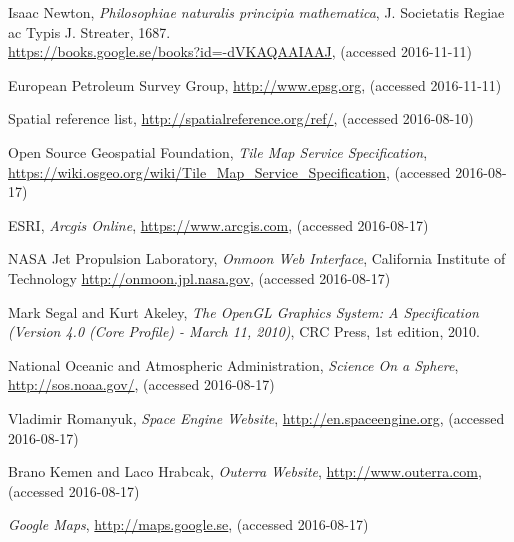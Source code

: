 \begin{thebibliography}{99}
  Isaac Newton,
  \emph{Philosophiae naturalis principia mathematica},
  J. Societatis Regiae ac Typis J. Streater,
  1687. \\
  \url{https://books.google.se/books?id=-dVKAQAAIAAJ},
  (accessed 2016-11-11)
  
  European Petroleum Survey Group,
  \url{http://www.epsg.org},
  (accessed 2016-11-11)
  
  Spatial reference list,
  \url{http://spatialreference.org/ref/},
  (accessed 2016-08-10)


  Open Source Geospatial Foundation,
  \emph{Tile Map Service Specification},
  \url{https://wiki.osgeo.org/wiki/Tile_Map_Service_Specification},
  (accessed 2016-08-17)
  
  ESRI,
  \emph{Arcgis Online},
  \url{https://www.arcgis.com},
  (accessed 2016-08-17)

  NASA Jet Propulsion Laboratory,
  \emph{Onmoon Web Interface},
  California Institute of Technology
  \url{http://onmoon.jpl.nasa.gov},
  (accessed 2016-08-17)
  
  Mark Segal and Kurt Akeley,
  \emph{The OpenGL Graphics System: A Specification (Version 4.0 (Core Profile) - March 11, 2010)},
  CRC Press,
  1st edition,
  2010.
  
  National Oceanic and Atmospheric Administration,
  \emph{Science On a Sphere},
  \url{http://sos.noaa.gov/},
  (accessed 2016-08-17)
  
  Vladimir Romanyuk,
  \emph{Space Engine Website},
  \url{http://en.spaceengine.org},
  (accessed 2016-08-17)
  
  Brano Kemen and Laco Hrabcak,
  \emph{Outerra Website},
  \url{http://www.outerra.com},
  (accessed 2016-08-17)
  
  \emph{Google Maps},
  \url{http://maps.google.se},
  (accessed 2016-08-17)
  

\end{thebibliography}
